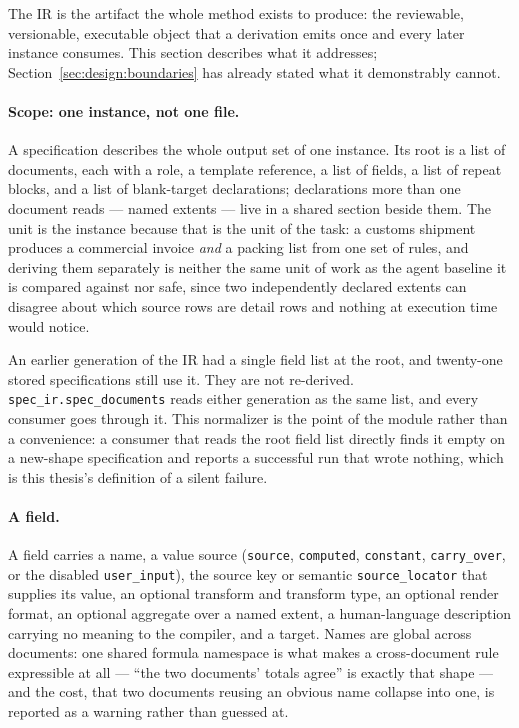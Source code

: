 The IR is the artifact the whole method exists to produce: the reviewable, versionable,
executable object that a derivation emits once and every later instance consumes. This
section describes what it addresses; Section~\ref{sec:design:boundaries} has already stated
what it demonstrably cannot.

\paragraph{Scope: one instance, not one file.}
A specification describes the whole output set of one instance. Its root is a list of
documents, each with a role, a template reference, a list of fields, a list of repeat
blocks, and a list of blank-target declarations; declarations more than one document reads
--- named extents --- live in a shared section beside them. The unit is the instance
because that is the unit of the task: a customs shipment produces a commercial invoice
\emph{and} a packing list from one set of rules, and deriving them separately is neither
the same unit of work as the agent baseline it is compared against nor safe, since two
independently declared extents can disagree about which source rows are detail rows and
nothing at execution time would notice.

An earlier generation of the IR had a single field list at the root, and twenty-one stored
specifications still use it. They are not re-derived. \texttt{spec\_ir.spec\_documents}
reads either generation as the same list, and every consumer goes through it. This
normalizer is the point of the module rather than a convenience: a consumer that reads
the root field list directly finds it empty on a new-shape specification and reports a
successful run that wrote nothing, which is this thesis's definition of a silent failure.

{\sloppy
\paragraph{A field.}
A field carries a name, a value source (\texttt{source}, \texttt{computed},
\texttt{constant}, \texttt{carry\_over}, or the disabled \texttt{user\_input}), the source
key or semantic \texttt{source\_locator} that supplies its value, an optional transform and
transform type, an optional render format, an optional aggregate over a named extent, a
human-language description carrying no meaning to the compiler, and a target. Names are
global across documents: one shared formula namespace is what makes a cross-document rule
expressible at all --- ``the two documents' totals agree'' is exactly that shape --- and the
cost, that two documents reusing an obvious name collapse into one, is reported as a
warning rather than guessed at.

\par}

